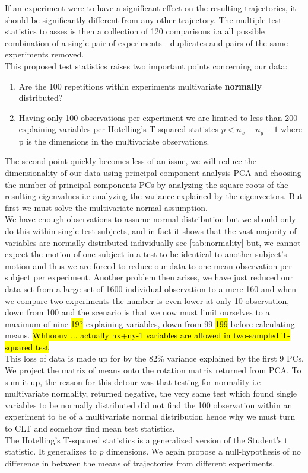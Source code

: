 \documentclass{article}
\begin{document}
If an experiment were to have a significant effect on the resulting trajectories, it should be significantly different from any other trajectory. The multiple test statistics to asses is then a collection of 120 comparisons i.a all possible combination of a single pair of experiments - duplicates and pairs of the same experiments removed.\\ 
This proposed test statistics raises two important points concerning our data:
\begin{enumerate}
	\item  Are the 100 repetitions within experiments multivariate \textbf{normally} distributed?
	\item Having only 100 observations per experiment we are limited to less than 200 explaining variables per Hotelling's T-squared statistcs $p < n_x + n_y -1$ where p is the dimensions in the multivariate observations.
\end{enumerate}

The second point quickly becomes less of an issue, we will reduce the dimensionality of our data using principal component analysis PCA and choosing the number of principal components PCs by analyzing the square roots of the resulting eigenvalues i.e analyzing the variance explained by the eigenvectors. But first we must solve the multivariate normal assumption. \\
 We have enough observations to assume normal distribution but we should only do this within single test subjects, and in fact it shows that the vast majority of variables are normally distributed individually see \ref{tab:normality} but, we cannot expect the motion of one subject in a test to be identical to another subject's motion and thus we are forced to reduce our data to one mean observation per subject per experiment. Another problem then arises, we have just reduced our data set from a large set of 1600 individual observation to a mere 160 and when we compare two experiments the number is even lower at only 10 observation, down from 100 and the scenario is that we now must limit ourselves to a maximum of nine \hl{19?} explaining variables, down from 99 \hl{199} before calculating means. \hl{Whhoouv ... actually nx+ny-1 variables are allowed in two-sampled T-squared test}\\
 This loss of data is made up for by the 82\% variance explained by the first 9 PCs. We project the matrix of means onto the rotation matrix returned from PCA. To sum it up, the reason for this detour was that testing for normality i.e multivariate normality, returned negative, the very same test which found single variables to be normally distributed did not find the 100 observation within an experiment to be of a multivariate normal distribution hence why we must turn to CLT and somehow find mean test statistics.\\
The Hotelling's T-squared statistics is a generalized version of the Student's t statistic. It generalizes to \textit{p} dimensions. We again propose a null-hypothesis of no difference in between the means of trajectories from different experiments. 
\end{document}
